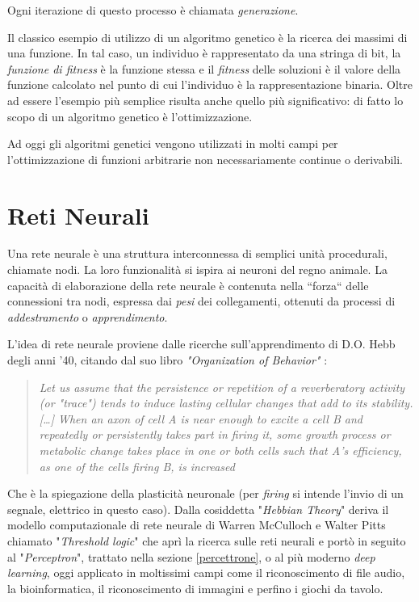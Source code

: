 \documentclass[12pt,a4paper]{report}
\begin{document}
Ogni iterazione di questo processo è chiamata \textit{generazione}.

Il classico esempio di utilizzo di un algoritmo genetico è la ricerca dei massimi di una funzione.
In tal caso, un individuo è rappresentato da una stringa di bit, la \textit{funzione di fitness} è la funzione stessa e il \textit{fitness} delle soluzioni è il valore della funzione calcolato nel punto di cui l'individuo è la rappresentazione binaria.
Oltre ad essere l'esempio più semplice risulta anche quello più significativo: di fatto lo scopo di un algoritmo genetico è l'ottimizzazione.  

Ad oggi gli algoritmi genetici vengono utilizzati in molti campi per l'ottimizzazione di funzioni arbitrarie non necessariamente continue o derivabili.

\section{Reti Neurali}

Una rete neurale è una struttura interconnessa di semplici unità procedurali, chiamate nodi. La loro funzionalità si ispira ai neuroni del regno animale. La capacità di elaborazione della rete neurale è contenuta nella ``forza`` delle connessioni tra nodi, espressa dai \textit{pesi} dei collegamenti, ottenuti da processi di \textit{ addestramento} o \textit{apprendimento}. \cite{neural-net-gurney}

L'idea di rete neurale proviene dalle ricerche sull'apprendimento di D.O. Hebb degli anni '40, citando dal suo libro \textit{"Organization of Behavior"} \cite{hebb-learning}:

\begin{quote}
 \begin{center}
  \textit{Let us assume that the persistence or repetition of a reverberatory activity (or "trace") tends to induce lasting cellular changes that add to its stability.[…] When an axon of cell A is near enough to excite a cell B and repeatedly or persistently takes part in firing it, some growth process or metabolic change takes place in one or both cells such that A's efficiency, as one of the cells firing B, is increased}
 \end{center}
\end{quote} 

Che è la spiegazione della plasticità neuronale (per \textit{firing} si intende l'invio di un segnale, elettrico in questo caso).
Dalla cosiddetta "\textit{Hebbian Theory}" deriva il modello computazionale di rete neurale di  Warren McCulloch e Walter Pitts chiamato "\textit{Threshold logic}" che aprì la ricerca sulle reti neurali e portò in seguito al "\textit{Perceptron}", trattato nella sezione \ref{percettrone}, o al più moderno \textit{deep learning},  oggi applicato in moltissimi campi come il riconoscimento di file audio, la bioinformatica, il riconoscimento di immagini e perfino i giochi da tavolo.
\end{document}
